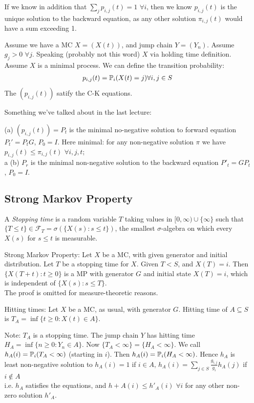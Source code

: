 \documentclass[a4paper]{article}
\begin{document}
If we know in addition that $\sum_j p_{i,j}(t) = 1$ $\forall i$, then we know $p_{i,j}(t)$ is the unique solution to the backward equation, as any other solution $\pi_{i,j}(t)$ would have a sum exceeding 1.

Assume we have a MC $X=(X(t))$, and jump chain $Y=(Y_n)$. Assume $g_j>0$ $\forall j$. Speaking (probably not this word) $X$ via holding time definition. Assume $X$ is a minimal process. We can define the transition probability: 
\begin{equation*}
\begin{aligned}
p_{i,j}(t) = \P_i(X(t)=j) \forall i,j \in S
\end{aligned}
\end{equation*}
The $(p_{i,j}(t))$ satify the C-K equations.

Something we've talked about in the last lecture:

(a) $(p_{i,j}(t))=P_t$ is the minimal no-negative solution to forward equation $P_t' = P_tG$, $P_0 = I$. Here minimal: for any non-negative solution $\pi$ we have $p_{i,j}(t) \leq \pi_{i,j}(t)$ $\forall i,j,t$;\\
a
(b) $P_r$ is the minimal non-negative solution to the backward equation $P'_t=GP_t$, $P_0=I$.

\subsection{Strong Markov Property}
A \emph{Stopping time} is a random variable $T$ taking values in $[0,\infty) \cup \{\infty\}$ such that $\{T \leq t\} \in \mathcal{F}_T = \sigma(\{X(s):s\leq t\})$, the smallest $\sigma$-algebra on which every $X(s)$ for $s\leq t$ is measurable.

Strong Markov Property: Let $X$ be a MC, with given generator and initial distribution. Let $T$ be a stopping time for $X$. Given $T<S$, and $X(T) = i$. Then $\{X(T+t):t \geq 0\}$ is a MP with generator $G$ and initial state $X(T) =i$, which is independent of $\{X(s):s \leq T\}$.\\
The proof is omitted for measure-theoretic reasons.

Hitting times: Let $X$ be a MC, as usual, with generator $G$. Hitting time of $A \subseteq S$ is $T_A = \inf \{t \geq 0: X(t) \in A\}$.

Note: $T_A$ is a stopping time. The jump chain $Y$ has hitting time $H_A= \inf\{n \geq 0:Y_n \in A\}$. Now $\{T_A < \infty\} = \{H_A < \infty\}$. We call $h_A(i) = \P_i(T_A < \infty)$ (starting in $i$). Then $h_A(i) = \P_i(H_A < \infty)$. Hence $h_A$ is least non-negative solution to $h_A(i) = 1$ if $i \in A$, $h_A (i) = \sum_{j \in S} \frac{g_{i,j}}{g_i} h_A(j)$ if $i \not\in A$\\
i.e. $h_A$ satisfies the equations, and $h+A(i) \leq h'_A(i)$ $\forall i$ for any other non-zero solution $h'_A$.
\end{document}
